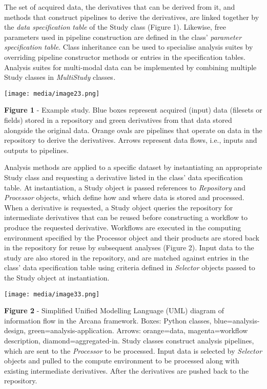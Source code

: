 The set of acquired data, the derivatives that can be derived from it,
and methods that construct pipelines to derive the derivatives, are
linked together by the \emph{data specification} \emph{table} of the
Study class (Figure 1). Likewise, free parameters used in pipeline
construction are defined in the class' \emph{parameter specification}
\emph{table}. Class inheritance can be used to specialise analysis
suites by overriding pipeline constructor methods or entries in the
specification tables. Analysis suites for multi-modal data can be
implemented by combining multiple Study classes in \emph{MultiStudy}
classes\emph{.}

\texttt{[image: media/image23.png]}

\textbf{Figure 1} - Example study. Blue boxes represent acquired (input)
data (filesets or fields) stored in a repository and green derivatives
from that data stored alongside the original data. Orange ovals are
pipelines that operate on data in the repository to derive the
derivatives. Arrows represent data flows, i.e., inputs and outputs to
pipelines.

Analysis methods are applied to a specific dataset by instantiating an
appropriate Study class and requesting a derivative listed in the class'
data specification table. At instantiation, a Study object is passed
references to \emph{Repository} and \emph{Processor} objects, which
define how and where data is stored and processed. When a derivative is
requested, a Study object queries the repository for intermediate
derivatives that can be reused before constructing a workflow to produce
the requested derivative. Workflows are executed in the computing
environment specified by the Processor object and their products are
stored back in the repository for reuse by subsequent analyses (Figure
2). Input data to the study are also stored in the repository, and are
matched against entries in the class' data specification table using
criteria defined in \emph{Selector} objects passed to the Study object
at instantiation.

\texttt{[image: media/image33.png]}

\textbf{Figure 2} - Simplified Unified Modelling Language (UML) diagram
of information flow in the Arcana framework. Boxes: Python classes,
blue=analysis-design, green=analysis-application. Arrows: orange=data,
magenta=workflow description, diamond=aggregated-in. Study classes
construct analysis pipelines, which are sent to the \emph{Processor} to
be processed. Input data is selected by \emph{Selector} objects and
pulled to the compute environment to be processed along with existing
intermediate derivatives. After the derivatives are pushed back to the
repository.

